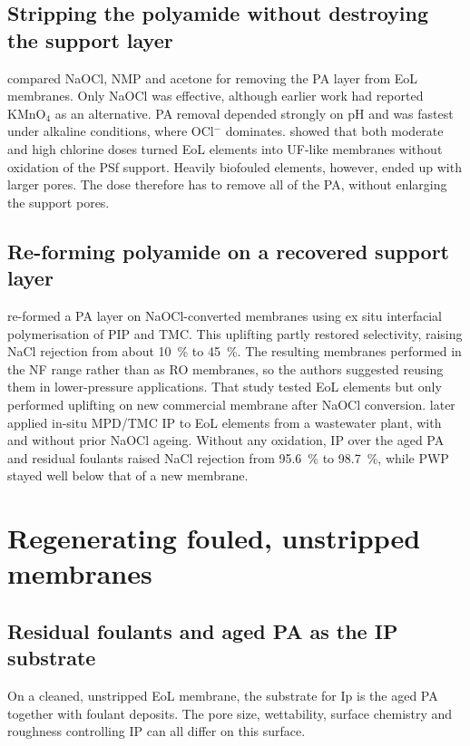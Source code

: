 \subsection{Stripping the polyamide without destroying the support layer}
\label{sec:pa-removal}

\citet{GarciaPacheco2015} compared NaOCl, NMP and acetone for removing the PA layer from EoL membranes. Only NaOCl was effective, although earlier work had reported KMnO$_4$ as an alternative. PA removal depended strongly on pH and was fastest under alkaline conditions, where OCl$^-$ dominates. \citet{Molinaa2018} showed that both moderate and high chlorine doses turned EoL elements into UF-like membranes without oxidation of the PSf support. Heavily biofouled elements, however, ended up with larger pores. The dose therefore has to remove all of the PA, without enlarging the support pores.

\subsection{Re-forming polyamide on a recovered support layer}

\citet{Ogbe2025} re-formed a PA layer on NaOCl-converted membranes using ex situ interfacial polymerisation of PIP and TMC. This uplifting partly restored selectivity, raising NaCl rejection from about \qty{10}{\percent} to \qty{45}{\percent}. The resulting membranes performed in the NF range rather than as RO membranes, so the authors suggested reusing them in lower-pressure applications. That study tested EoL elements but only performed uplifting on new commercial membrane after NaOCl conversion. \citet{Ogbe2026} later applied in-situ MPD/TMC IP to EoL elements from a wastewater plant, with and without prior NaOCl ageing. Without any oxidation, IP over the aged PA and residual foulants raised NaCl rejection from \qty{95.6}{\percent} to \qty{98.7}{\percent}, while PWP stayed well below that of a new membrane.

\section{Regenerating fouled, unstripped membranes}
\label{sec:fouling-ip}

\subsection{Residual foulants and aged PA as the IP substrate}
\label{sec:lit-residual}
On a cleaned, unstripped EoL membrane, the substrate for Ip is the aged PA together with foulant deposits. The pore size, wettability, surface chemistry and roughness controlling IP can all differ on this surface. 

